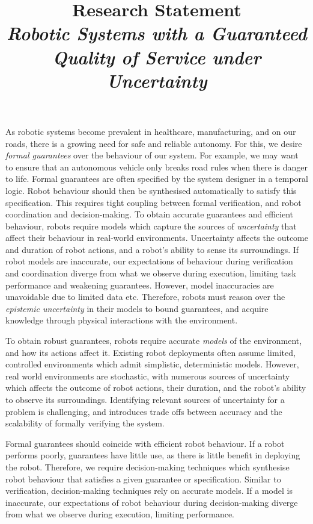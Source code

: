 \documentclass[11pt]{article}
\title{Research Statement\\ \large \emph{Robotic Systems with a Guaranteed Quality of Service under Uncertainty}}
\date{}
\author{}
\begin{document}
\maketitle
\thispagestyle{empty}


As robotic systems become prevalent in healthcare, manufacturing, and on our roads, there is a growing need for safe and reliable autonomy.
%
For this, we desire \emph{formal guarantees} over the behaviour of our system.
%
For example, we may want to ensure that an autonomous vehicle only breaks road rules when there is danger to life.
%
Formal guarantees are often specified by the system designer in a temporal logic.
%
Robot behaviour should then be synthesised automatically to satisfy this specification.
%
This requires tight coupling between formal verification, and robot coordination and decision-making.
%
To obtain accurate guarantees and efficient behaviour, robots require models which capture the sources of \emph{uncertainty} that affect their behaviour in real-world environments.
%
Uncertainty affects the outcome and duration of robot actions, and a robot's ability to sense its surroundings.
%
If robot models are inaccurate, our expectations of behaviour during verification and coordination diverge from what we observe during execution, limiting task performance and weakening guarantees.
%
However, model inaccuracies are unavoidable due to limited data etc.
%
Therefore, robots must reason over the \emph{epistemic uncertainty} in their models to bound guarantees, and acquire knowledge through physical interactions with the environment.


\iffalse
%
To obtain robust guarantees, robots require accurate \emph{models} of the environment, and how its actions affect it.
%
Existing robot deployments often assume limited, controlled environments which admit simplistic, deterministic models.
%
However, real world environments are stochastic, with numerous sources of uncertainty which affects the outcome of robot actions, their duration, and the robot's ability to observe its surroundings.
%
Identifying relevant sources of uncertainty for a problem is challenging, and introduces trade offs between accuracy and the scalability of formally verifying the system.



Formal guarantees should coincide with efficient robot behaviour.
%
If a robot performs poorly, guarantees have little use, as there is little benefit in deploying the robot.
%
Therefore, we require decision-making techniques which synthesise robot behaviour that satisfies a given guarantee or specification.
%
Similar to verification, decision-making techniques rely on accurate models.
%
If a model is inaccurate, our expectations of robot behaviour during decision-making diverge from what we observe during execution, limiting performance.
\end{document}
